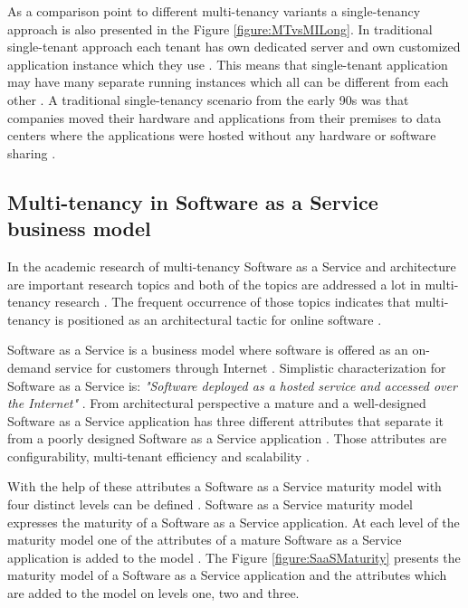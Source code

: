 \documentclass[conference]{sasmoota2017}
\begin{document}
As a comparison point to different multi-tenancy variants a single-tenancy approach is also presented in the Figure \ref{figure:MTvsMILong}. In traditional single-tenant approach each tenant has own dedicated server and own customized application instance which they use \cite{Bezemer:2010:MaintenanceDream}. This means that single-tenant application may have many separate running instances which all can be different from each other \cite{Bezemer:2010:MaintenanceDream}. A traditional single-tenancy scenario from the early 90s was that companies moved their hardware and applications from their premises to data centers where the applications were hosted without any hardware or software sharing \cite{Guo:2007:FrameworkForNative}. 

\subsection{Multi-tenancy in Software as a Service business model}

In the academic research of multi-tenancy Software as a Service and architecture are important research topics and both of the topics are addressed a lot in multi-tenancy research \cite{Kabbedijk2015:Defining}. The frequent occurrence of those topics indicates that multi-tenancy is positioned as an architectural tactic for online software \cite{Kabbedijk2015:Defining}. 

Software as a Service is a business model where software is offered as an on-demand service for customers through Internet \cite{Bezemer:2010:MaintenanceDream}. Simplistic characterization for Software as a Service is: \textit{"Software deployed as a hosted service and accessed over the Internet"} \cite{Carraro:2006:ArchitectureLongTail}. From architectural perspective a mature and a well-designed Software as a Service application has three different attributes that separate it from a poorly designed Software as a Service application \cite{Carraro:2006:ArchitectureLongTail}. Those attributes are configurability, multi-tenant efficiency and scalability \cite{Carraro:2006:ArchitectureLongTail}.

With the help of these attributes a Software as a Service maturity model with four distinct levels can be defined \cite{Carraro:2006:ArchitectureLongTail}. Software as a Service maturity model expresses the maturity of a Software as a Service application. At each level of the maturity model one of the attributes of a mature Software as a Service application is added to the model \cite{Carraro:2006:ArchitectureLongTail}. The Figure \ref{figure:SaaSMaturity} presents the maturity model of a Software as a Service application and the attributes which are added to the model on levels one, two and three. 
\end{document}
